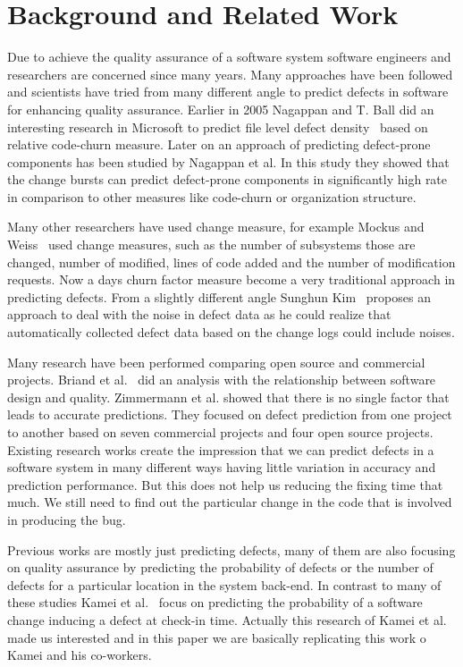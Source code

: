 \documentclass[10pt, conference]{IEEEtran}
\begin{document}
\section{Background and Related Work}
\label{sec:backgr-relat-work}

Due to achieve the quality assurance of a software system software engineers and researchers are concerned since many years. Many approaches have been followed and scientists have tried from many different angle to predict defects in software for enhancing quality assurance. Earlier in 2005 Nagappan and T. Ball did an interesting research in Microsoft to predict file level defect density~\cite{Nagappan2005ICSE} based on relative code-churn measure. Later on an approach of predicting defect-prone components has been studied by Nagappan et al. In this study they showed that the change bursts can predict defect-prone components in significantly high rate in comparison to other measures like code-churn or organization structure.

Many other researchers have used change measure, for example Mockus and Weiss~\cite{Mockus2000Bell} used change measures, such as the number of subsystems those are changed, number of modified, lines of code added and the number of modification requests. Now a days churn factor measure become a very traditional approach in predicting defects. From a slightly different angle Sunghun Kim~\cite{Kim2011ICSE} proposes an approach to deal with the noise in defect data as he could realize that automatically collected defect data based on the change logs could include noises.

Many research have been performed comparing open source and commercial projects. Briand et al.~\cite{Briand1999ICSE} did an analysis with the relationship between software design and quality. Zimmermann et al.\cite{Zimmermann2009ESECS} showed that there is no single factor that leads to accurate predictions. They focused on defect prediction from one project to another based on seven commercial projects and four open source projects. Existing research works create the impression that we can predict defects in a software system in many different ways having little variation in accuracy and prediction performance. But this does not help us reducing the fixing time that much. We still need to find out the particular change in the code that is involved in producing the bug.

Previous works are mostly just predicting defects, many of them are also focusing on quality assurance by predicting the probability of defects or the number of defects for a particular location in the system back-end. In contrast to many of these studies Kamei et al.~\cite{Kamei2013TSE} focus on predicting the probability of a software change inducing a defect at check-in time. Actually this research of Kamei et al. made us interested and in this paper we are basically replicating this work o Kamei and his co-workers.
\end{document}
